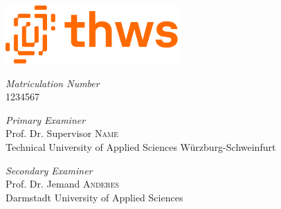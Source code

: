 \begin{titlepage} %
    \newcommand{\HRule}{\rule{\linewidth}{0.5mm}} %

    \center %

    \includegraphics[width=0.5\textwidth]{img/THWS}\\[1cm] %


    \vfill\vfill


    \begin{flushleft}
        \large
        \textit{Matriculation Number}\\
        1234567
    \end{flushleft}

    \begin{flushleft}
        \large
        \textit{Primary Examiner}\\
        Prof. Dr. Supervisor \textsc{Name}\\
        Technical University of Applied Sciences Würzburg-Schweinfurt
    \end{flushleft}

    \begin{flushleft}
        \large
        \textit{Secondary Examiner}\\
        Prof. Dr. Jemand \textsc{Anderes}\\
        Darmstadt University of Applied Sciences
    \end{flushleft}

    \vfill

\end{titlepage}


% 